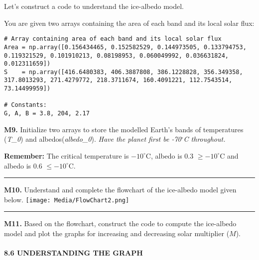 \documentclass[
  letterpaper,
  DIV=11,
  numbers=noendperiod]{scrartcl}
\let\oldparagraph\paragraph
\renewcommand{\paragraph}[1]{\oldparagraph{#1}\mbox{}}
\begin{document}
\begin{tcolorbox}[enhanced jigsaw, titlerule=0mm, title={Modelling Questions}, arc=.35mm, breakable, colback=white, toprule=.15mm, colframe=quarto-callout-caution-color-frame, opacityback=0, bottomtitle=1mm, coltitle=black, toptitle=1mm, rightrule=.15mm, colbacktitle=quarto-callout-caution-color!10!white, bottomrule=.15mm, opacitybacktitle=0.6, leftrule=.75mm, left=2mm]

Let's construct a code to understand the ice-albedo model.

You are given two arrays containing the area of each band and its local
solar flux:

\begin{verbatim}
# Array containing area of each band and its local solar flux
Area = np.array([0.156434465, 0.152582529, 0.144973505, 0.133794753, 0.119321529, 0.101910213, 0.08198953, 0.060049992, 0.036631824, 0.012311659])
S    = np.array([416.6480383, 406.3887808, 386.1228828, 356.349358, 317.8013293, 271.4279772, 218.3711674, 160.4091221, 112.7543514, 73.14499959])

# Constants:
G, A, B = 3.8, 204, 2.17
\end{verbatim}

\textbf{M9.} Initialize two arrays to store the modelled Earth's bands
of temperatures (\emph{T\_0}) and albedos(\emph{albedo\_0}). \emph{Have
the planet first be -70\(^\circ\)C throughout.}

\textbf{Remember:} The critical temperature is \(-10^\circ\)C, albedo is
0.3 \(\ge -10^\circ\)C and albedo is 0.6 \(\le -10^\circ\)C.

\begin{center}\rule{0.5\linewidth}{0.5pt}\end{center}

\textbf{M10.} Understand and complete the flowchart of the ice-albedo
model given below.
\texttt{[image: Media/FlowChart2.png]}

\begin{center}\rule{0.5\linewidth}{0.5pt}\end{center}

\textbf{M11.} Based on the flowchart, construct the code to compute the
ice-albedo model and plot the graphs for increasing and decreasing solar
multiplier (\(M\)).

\end{tcolorbox}

\hypertarget{understanding-the-graph}{%
\paragraph{8.6 UNDERSTANDING THE GRAPH}\label{understanding-the-graph}}
\end{document}
